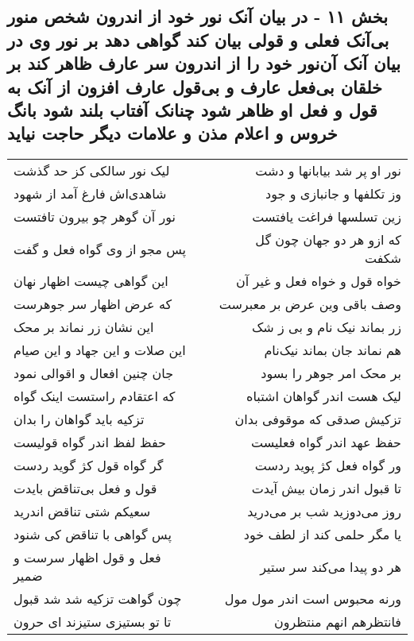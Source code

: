 \begin{center}
\section*{بخش ۱۱ - در بیان آنک نور خود از اندرون شخص منور بی‌آنک فعلی و قولی بیان کند گواهی دهد بر نور وی در بیان آنک آن‌نور خود را از اندرون سر عارف ظاهر کند بر خلقان بی‌فعل عارف و بی‌قول عارف افزون از آنک به قول و فعل او ظاهر شود چنانک آفتاب بلند شود بانگ خروس و اعلام مذن و علامات دیگر حاجت نیاید}
\label{sec:sh011}
\begin{longtable}{l p{0.5cm} r}
لیک نور سالکی کز حد گذشت
&&
نور او پر شد بیابانها و دشت
\\
شاهدی‌اش فارغ آمد از شهود
&&
وز تکلفها و جانبازی و جود
\\
نور آن گوهر چو بیرون تافتست
&&
زین تسلسها فراغت یافتست
\\
پس مجو از وی گواه فعل و گفت
&&
که ازو هر دو جهان چون گل شکفت
\\
این گواهی چیست اظهار نهان
&&
خواه قول و خواه فعل و غیر آن
\\
که عرض اظهار سر جوهرست
&&
وصف باقی وین عرض بر معبرست
\\
این نشان زر نماند بر محک
&&
زر بماند نیک نام و بی ز شک
\\
این صلات و این جهاد و این صیام
&&
هم نماند جان بماند نیک‌نام
\\
جان چنین افعال و اقوالی نمود
&&
بر محک امر جوهر را بسود
\\
که اعتقادم راستست اینک گواه
&&
لیک هست اندر گواهان اشتباه
\\
تزکیه باید گواهان را بدان
&&
تزکیش صدقی که موقوفی بدان
\\
حفظ لفظ اندر گواه قولیست
&&
حفظ عهد اندر گواه فعلیست
\\
گر گواه قول کژ گوید ردست
&&
ور گواه فعل کژ پوید ردست
\\
قول و فعل بی‌تناقض بایدت
&&
تا قبول اندر زمان بیش آیدت
\\
سعیکم شتی تناقض اندرید
&&
روز می‌دوزید شب بر می‌درید
\\
پس گواهی با تناقض کی شنود
&&
یا مگر حلمی کند از لطف خود
\\
فعل و قول اظهار سرست و ضمیر
&&
هر دو پیدا می‌کند سر ستیر
\\
چون گواهت تزکیه شد شد قبول
&&
ورنه محبوس است اندر مول مول
\\
تا تو بستیزی ستیزند ای حرون
&&
فانتظرهم انهم منتظرون
\\
\end{longtable}
\end{center}
